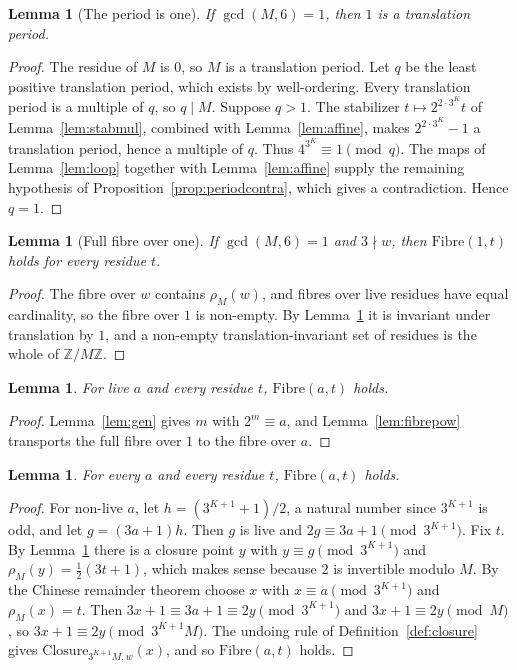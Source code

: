 \documentclass[11pt,reqno,oneside]{amsart}
\theoremstyle{plain}
\newtheorem{lemma}[theorem]{Lemma}
\theoremstyle{definition}
\numberwithin{equation}{section}
\begin{document}
\begin{lemma}[The period is one]\label{lem:one}
If $\gcd(M,6)=1$, then $1$ is a translation period.
\end{lemma}
\begin{proof}
The residue of $M$ is $0$, so $M$ is a translation period. Let $q$ be the least positive translation period, which exists by well-ordering. Every translation period is a multiple of $q$, so $q\mid M$. Suppose $q>1$. The stabilizer $t\mapsto2^{2\cdot3^K}t$ of Lemma~\ref{lem:stabmul}, combined with Lemma~\ref{lem:affine}, makes $2^{2\cdot3^K}-1$ a translation period, hence a multiple of $q$. Thus $4^{3^K}\equiv1\pmod q$. The maps of Lemma~\ref{lem:loop} together with Lemma~\ref{lem:affine} supply the remaining hypothesis of Proposition~\ref{prop:periodcontra}, which gives a contradiction. Hence $q=1$.
\end{proof}

\begin{lemma}[Full fibre over one]\label{lem:fullone}
If $\gcd(M,6)=1$ and $3\nmid w$, then $\mathrm{Fibre}(1,t)$ holds for every residue $t$.
\end{lemma}
\begin{proof}
The fibre over $w$ contains $\rho_M(w)$, and fibres over live residues have equal cardinality, so the fibre over $1$ is non-empty. By Lemma~\ref{lem:one} it is invariant under translation by $1$, and a non-empty translation-invariant set of residues is the whole of $\mathbb Z/M\mathbb Z$.
\end{proof}

\begin{lemma}\label{lem:fulllive}
For live $a$ and every residue $t$, $\mathrm{Fibre}(a,t)$ holds.
\end{lemma}
\begin{proof}
Lemma~\ref{lem:gen} gives $m$ with $2^m\equiv a$, and Lemma~\ref{lem:fibrepow} transports the full fibre over $1$ to the fibre over $a$.
\end{proof}

\begin{lemma}\label{lem:fullall}
For every $a$ and every residue $t$, $\mathrm{Fibre}(a,t)$ holds.
\end{lemma}
\begin{proof}
For non-live $a$, let $h=(3^{K+1}+1)/2$, a natural number since $3^{K+1}$ is odd, and let $g=(3a+1)h$. Then $g$ is live and $2g\equiv3a+1\pmod{3^{K+1}}$. Fix $t$. By Lemma~\ref{lem:fulllive} there is a closure point $y$ with $y\equiv g\pmod{3^{K+1}}$ and $\rho_M(y)=\tfrac12(3t+1)$, which makes sense because $2$ is invertible modulo $M$. By the Chinese remainder theorem choose $x$ with $x\equiv a\pmod{3^{K+1}}$ and $\rho_M(x)=t$. Then $3x+1\equiv3a+1\equiv2y\pmod{3^{K+1}}$ and $3x+1\equiv2y\pmod M$, so $3x+1\equiv2y\pmod{3^{K+1}M}$. The undoing rule of Definition~\ref{def:closure} gives $\mathrm{Closure}_{3^{K+1}M,w}(x)$, and so $\mathrm{Fibre}(a,t)$ holds.
\end{proof}
\end{document}

